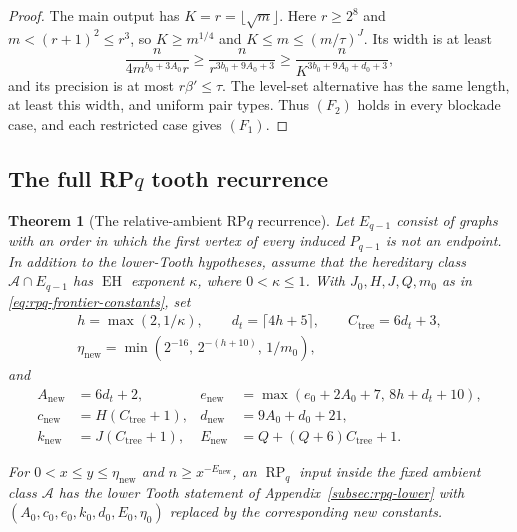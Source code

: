 \documentclass[11pt,a4paper]{article}
\newtheorem{theorem}{Theorem}[section]
\theoremstyle{definition}
\theoremstyle{remark}
\numberwithin{equation}{section}
\DeclareMathOperator{\RP}{RP}
\begin{document}
\begin{proof}
The main output has \(K=r=\lfloor \sqrt{m}\rfloor\). Here \(r\ge 2^{8}\) and \(m<(r+1)^{2}\le r^{3}\), so \(K\ge m^{1/4}\) and \(K\le m\le (m/\tau)^{J}\). Its width is at least
\[
 \frac{n}{4m^{b_{0}+3A_{0}}r}\ge\frac{n}{r^{3b_{0}+9A_{0}+3}}
 \ge\frac{n}{K^{3b_{0}+9A_{0}+d_{0}+3}},
\]
and its precision is at most \(r\beta'\le\tau\). The level-set alternative has the same length, at least this width, and uniform pair types. Thus \((F_{2})\) holds in every blockade case, and each restricted case gives \((F_{1})\).
\end{proof}
\subsection{The full \texorpdfstring{RP\(q\)}{RPq} tooth recurrence}\label{subsec:rpq-recurrence}
\begin{theorem}[The relative-ambient RP\(q\) recurrence]\label{thm:rpq}
Let \(E_{q-1}\) consist of graphs with an order in which the first vertex of every induced \(P_{q-1}\) is not an endpoint. In addition to the lower-Tooth hypotheses, assume that the hereditary class \(\mathcal A\cap  E_{q-1}\) has \(\operatorname{EH}\) exponent \(\kappa\), where \(0<\kappa\le 1\). With \(J_{0},H,J,Q,m_{0}\) as in \eqref{eq:rpq-frontier-constants}, set
\begin{equation}\label{eq:rpq-tree-constants}
\begin{gathered}
 h=\max (2,1/\kappa),\qquad d_{t}=\lceil 4h+5\rceil,\qquad C_{\mathrm{tree}}=6d_{t}+3,\\
 \eta_{\mathrm{new}}=\min (2^{-16},\,2^{-(h+10)},\,1/m_{0}),
\end{gathered}
\end{equation}
and
\begin{equation}\label{eq:rpq-new-constants}
\begin{aligned}
 A_{\mathrm{new}}&=6d_{t}+2, & e_{\mathrm{new}}&=\max (e_{0}+2A_{0}+7,\,8h+d_{t}+10),\\
 c_{\mathrm{new}}&=H(C_{\mathrm{tree}}+1), & d_{\mathrm{new}}&=9A_{0}+d_{0}+21,\\
 k_{\mathrm{new}}&=J(C_{\mathrm{tree}}+1), & E_{\mathrm{new}}&=Q+(Q+6)C_{\mathrm{tree}}+1.
\end{aligned}
\end{equation}



For \(0<x\le\allowbreak y\le\allowbreak \eta_{\mathrm{new}}\) and \(n\ge\allowbreak x^{-E_{\mathrm{new}}}\), an \(\RP_{q}\) input inside the fixed ambient class \(\mathcal A\) has the lower Tooth statement of Appendix~\ref{subsec:rpq-lower} with \((A_{0},\allowbreak c_{0},\allowbreak e_{0},\allowbreak k_{0},\allowbreak d_{0},\allowbreak E_{0},\allowbreak \eta_{0})\) replaced by the corresponding new constants.
\end{theorem}
\end{document}
